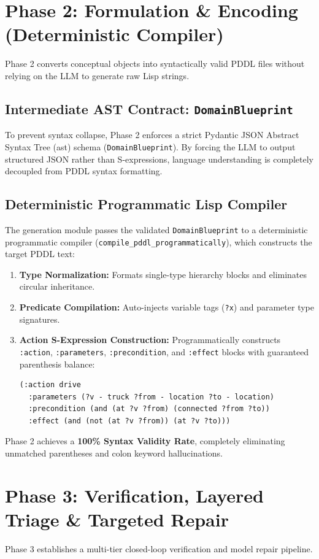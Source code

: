 \section{Phase 2: Formulation \& Encoding (Deterministic Compiler)}
Phase 2 converts conceptual objects into syntactically valid PDDL files without relying on the LLM to generate raw Lisp strings.

\subsection{Intermediate AST Contract: \texttt{DomainBlueprint}}
To prevent syntax collapse, Phase 2 enforces a strict Pydantic JSON Abstract Syntax Tree (\gls{ast}) schema (\texttt{DomainBlueprint}). By forcing the LLM to output structured JSON rather than S-expressions, language understanding is completely decoupled from PDDL syntax formatting.

\subsection{Deterministic Programmatic Lisp Compiler}
The generation module passes the validated \texttt{DomainBlueprint} to a deterministic programmatic compiler (\texttt{compile\_pddl\_programmatically}), which constructs the target PDDL text:
\begin{enumerate}[label=(\alph*)]
    \item \textbf{Type Normalization:} Formats single-type hierarchy blocks and eliminates circular inheritance.
    \item \textbf{Predicate Compilation:} Auto-injects variable tags (\texttt{?x}) and parameter type signatures.
    \item \textbf{Action S-Expression Construction:} Programmatically constructs \texttt{:action}, \texttt{:parameters}, \texttt{:precondition}, and \texttt{:effect} blocks with guaranteed parenthesis balance:
    \begin{lstlisting}[language=pddl, caption=Compiled PDDL Action Schema Example]
(:action drive
  :parameters (?v - truck ?from - location ?to - location)
  :precondition (and (at ?v ?from) (connected ?from ?to))
  :effect (and (not (at ?v ?from)) (at ?v ?to)))
    \end{lstlisting}
\end{enumerate}
Phase 2 achieves a \textbf{100\% Syntax Validity Rate}, completely eliminating unmatched parentheses and colon keyword hallucinations.

\section{Phase 3: Verification, Layered Triage \& Targeted Repair}
Phase 3 establishes a multi-tier closed-loop verification and model repair pipeline.

